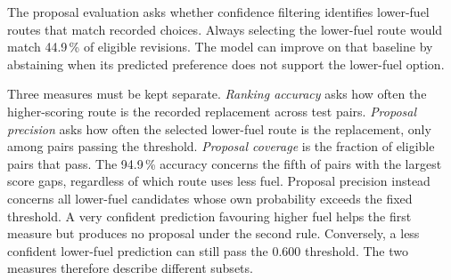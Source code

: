 \documentclass[a4paper,conference]{IEEEtran}
\begin{document}




The proposal evaluation asks whether confidence filtering identifies
lower-fuel routes that match recorded choices. Always selecting the
lower-fuel route would match 44.9\,\% of eligible revisions. The model
can improve on that baseline by abstaining when its predicted preference
does not support the lower-fuel option.

Three measures must be kept separate. \emph{Ranking accuracy} asks how
often the higher-scoring route is the recorded replacement across test
pairs. \emph{Proposal precision} asks how often the selected lower-fuel
route is the replacement, only among pairs passing the threshold.
\emph{Proposal coverage} is the fraction of eligible pairs that pass.
The 94.9\,\% accuracy concerns the fifth of pairs with the largest
score gaps, regardless of which route uses less fuel. Proposal precision
instead concerns all lower-fuel candidates whose own probability exceeds
the fixed threshold. A very confident prediction favouring higher fuel
helps the first measure but produces no proposal under the second rule.
Conversely, a less confident lower-fuel prediction can still pass the
0.600 threshold. The two measures therefore describe different subsets.
\end{document}
